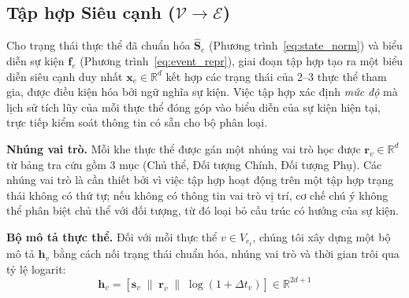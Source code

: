 \documentclass[letterpaper,twocolumn,10pt]{article}
\begin{document}
\subsection{Tập hợp Siêu cạnh ($\mathcal{V} \to \mathcal{E}$)}
\label{sec:aggregation}

Cho trạng thái thực thể đã chuẩn hóa $\hat{\mathbf{S}}_e$ (Phương trình~\ref{eq:state_norm}) và biểu diễn sự kiện $\mathbf{f}_e$ (Phương trình~\ref{eq:event_repr}), giai đoạn tập hợp tạo ra một biểu diễn siêu cạnh duy nhất $\mathbf{x}_e \in \mathbb{R}^d$ kết hợp các trạng thái của 2--3 thực thể tham gia, được điều kiện hóa bởi ngữ nghĩa sự kiện. Việc tập hợp xác định \emph{mức độ} mà lịch sử tích lũy của mỗi thực thể đóng góp vào biểu diễn của sự kiện hiện tại, trực tiếp kiểm soát thông tin có sẵn cho bộ phân loại.

\textbf{Nhúng vai trò.} Mỗi khe thực thể được gán một nhúng vai trò học được $\mathbf{r}_v \in \mathbb{R}^d$ từ bảng tra cứu gồm 3 mục (Chủ thể, Đối tượng Chính, Đối tượng Phụ). Các nhúng vai trò là cần thiết bởi vì việc tập hợp hoạt động trên một tập hợp trạng thái không có thứ tự; nếu không có thông tin vai trò vị trí, cơ chế chú ý không thể phân biệt chủ thể với đối tượng, từ đó loại bỏ cấu trúc có hướng của sự kiện.

\textbf{Bộ mô tả thực thể.} Đối với mỗi thực thể $v \in V_{e_t}$, chúng tôi xây dựng một bộ mô tả $\mathbf{h}_v$ bằng cách nối trạng thái chuẩn hóa, nhúng vai trò và thời gian trôi qua tỷ lệ logarit:
\begin{equation}
    \mathbf{h}_v = [\hat{\mathbf{s}}_v \;\|\; \mathbf{r}_v \;\|\; \log(1 + \Delta t_v)] \in \mathbb{R}^{2d + 1}
    \label{eq:entity_descriptor}
\end{equation}
\end{document}
